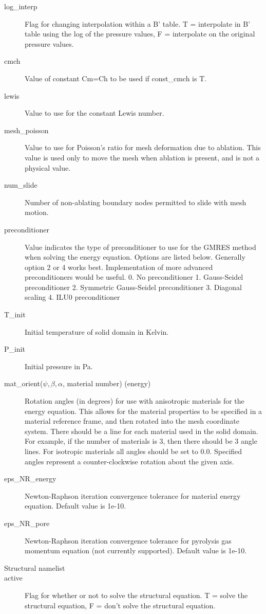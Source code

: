 \documentclass[]{article}
\begin{document}
\begin{description}
\item[log\_interp] Flag for changing interpolation within a B' table. T = interpolate in B' table using the log of the pressure values, F = interpolate on the original pressure values.
\item[cmch] Value of constant Cm=Ch to be used if const\_cmch is T.
\item[lewis] Value to use for the constant Lewis number.
\item[mesh\_poisson] Value to use for Poisson's ratio for mesh deformation due to ablation. This value is used only to move the mesh when ablation is present, and is not a physical value.
\item[num\_slide] Number of non-ablating boundary nodes permitted to slide with mesh motion.
\item[preconditioner] Value indicates the type of preconditioner to use for the GMRES method when solving the energy equation.  Options are listed below. Generally option 2 or 4 works best.  Implementation of more advanced preconditioners would be useful.
0. No preconditioner
1. Gauss-Seidel preconditioner
2. Symmetric Gauss-Seidel preconditioner
3. Diagonal scaling
4. ILU0 preconditioner
\item[T\_init] Initial temperature of solid domain in Kelvin.
\item[P\_init] Initial pressure in Pa.
\item[mat\_orient($\psi,\beta,\alpha$, material number) (energy)] Rotation angles (in degrees) for use with anisotropic materials for the energy equation. This allows for the material properties to be specified in a material reference frame, and then rotated into the mesh coordinate system. There should be a line for each material used in the solid domain. For example, if the number of materials is 3, then there should be 3 angle lines. For isotropic materials all angles should be set to 0.0. Specified angles represent a counter-clockwise rotation about the given axis.
\item[eps\_NR\_energy] Newton-Raphson iteration convergence tolerance for material energy equation.  Default value is 1e-10.
\item[eps\_NR\_pore] Newton-Raphson iteration convergence tolerance for pyrolysis gas momentum equation (not currently supported).  Default value is 1e-10.
\\
\item[Structural namelist]
\item[active] Flag for whether or not to solve the structural equation. T = solve the structural equation, F = don't solve the structural equation. 

\end{description}
\end{document}
